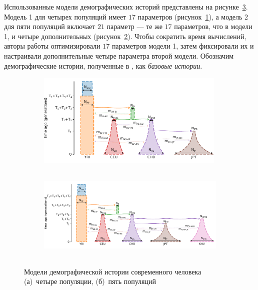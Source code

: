 Использованные модели демографических историй представлены на рисунке~\ref{fig:bo_human:models}.
Модель 1 для четырех популяций имеет $17$ параметров (рисунок~\ref{fig:bo_human:models:4pops}), а модель 2 для пяти популяций включает $21$ параметр --- те же $17$ параметров, что в модели 1, и четыре дополнительных (рисунок~\ref{fig:bo_human:models:5pops}).
Чтобы сократить время вычислений, авторы работы \cite{jouganous2017inferring} оптимизировали $17$ параметров модели 1, затем фиксировали их и настраивали дополнительные четыре параметра второй модели.
Обозначим демографические истории, полученные в \cite{jouganous2017inferring}, как \emph{базовые истории}.

\begin{figure}[ht]
    \centering
    \centering
    \begin{subfigure}[b]{\linewidth}
        \centering
        \includegraphics[height=4.5cm]{images_experiments/bo_human/4pops_model.pdf}
        \caption{}
        \label{fig:bo_human:models:4pops}
    \end{subfigure}
    \begin{subfigure}[b]{\linewidth}
        \centering
        \includegraphics[height=4.5cm]{images_experiments/bo_human/5pops_model.pdf}
        \caption{}
        \label{fig:bo_human:models:5pops}
    \end{subfigure}
    \caption{Модели демографической истории современного человека (а)~четыре популяции, (б)~пять популяций}
    \label{fig:bo_human:models}
\end{figure}

